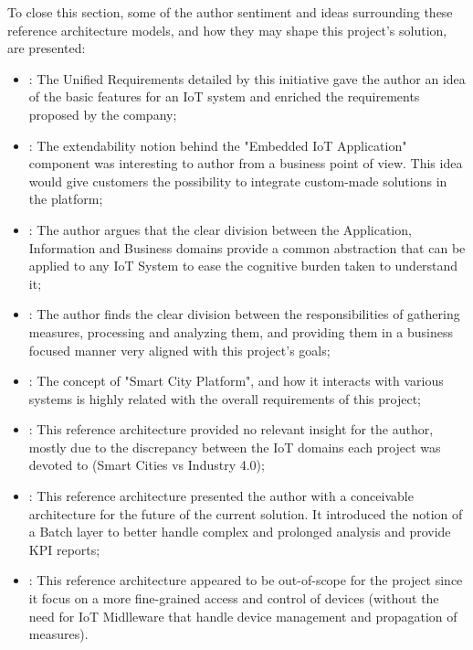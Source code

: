 To close this section, some of the author sentiment and ideas surrounding these reference architecture models, and how they may shape this project's solution, are presented:

\begin{itemize}
    \item {}: The Unified Requirements detailed by this initiative gave the author an idea of the basic features for an \gls{IoT} system and enriched the requirements proposed by the company;
    \item {}: The extendability notion behind the "Embedded IoT Application" component was interesting to author from a business point of view. This idea would give customers the possibility to integrate custom-made solutions in the platform;
    \item {}: The author argues that the clear division between the Application, Information and Business domains provide a common abstraction that can be applied to any \gls{IoT} System to ease the cognitive burden taken to understand it;
    \item {}: The author finds the clear division between the responsibilities of gathering measures, processing and analyzing them, and providing them in a business focused manner very aligned with this project's goals;
    \item {}: The concept of "Smart City Platform", and how it interacts with various systems is highly related with the overall requirements of this project;
    \item {}: This reference architecture provided no relevant insight for the author, mostly due to the discrepancy between the \gls{IoT} domains each project was devoted to (Smart Cities vs Industry 4.0);
    \item {}: This reference architecture presented the author with a conceivable architecture for the future of the current solution. It introduced the notion of a Batch layer to better handle complex and prolonged analysis and provide \gls{KPI} reports;
    \item {}: This reference architecture appeared to be out-of-scope for the project since it focus on a more fine-grained access and control of devices (without the need for \gls{IoT} Midlleware that handle device management and propagation of measures).
\end{itemize}

